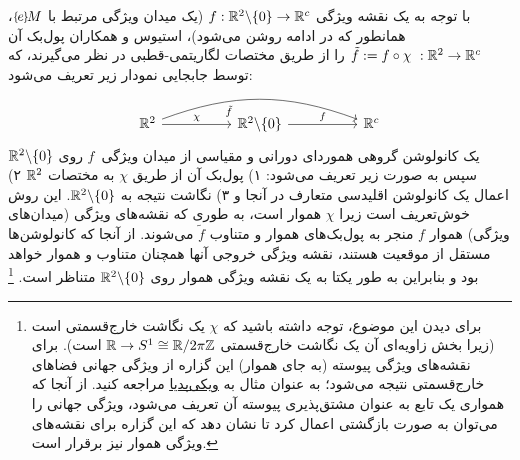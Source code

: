 با توجه به یک نقشه ویژگی $f: \mathbb{R}^2 \backslash \{0\} \to \mathbb{R}^c$ (یک میدان ویژگی مرتبط با $\eM$، همانطور که در ادامه روشن می‌شود)، استیوس و همکاران \cite{esteves2017polar} پول‌بک آن $\tilde{f} := f \circ \chi \ : \mathbb{R}^2 \to \mathbb{R}^c$ را از طریق مختصات لگاریتمی-قطبی در نظر می‌گیرند، که توسط جابجایی نمودار زیر تعریف می‌شود:
\begin{equation}
	\begin{tikzcd}[row sep=2.5em, column sep=5.em]
		\R^2
		\arrow[r, "\chi"]
		\arrow[rr, bend left=20, "\tilde{f}"', pos=0.3]
		& \R^2 \backslash \{0\}
		\arrow[r, "f"]
		& \R^c
	\end{tikzcd}
\end{equation}
یک کانولوشن گروهی هموردای دورانی و مقیاسی از میدان ویژگی~$f$ روی $\mathbb{R}^2 \backslash \{0\}$ سپس به صورت زیر تعریف می‌شود:
۱) پول‌بک آن از طریق $\chi$ به مختصات $\mathbb{R}^2$
۲) اعمال یک کانولوشن اقلیدسی متعارف در آنجا و
۳) نگاشت نتیجه به $\mathbb{R}^2 \backslash \{0\}$.
این روش خوش‌تعریف است زیرا $\chi$ هموار است، به طوری که نقشه‌های ویژگی (میدان‌های ویژگی) هموار $f$ منجر به پول‌بک‌های هموار و متناوب $\tilde{f}$ می‌شوند.
از آنجا که کانولوشن‌ها مستقل از موقعیت هستند، نقشه ویژگی خروجی آنها همچنان متناوب و هموار خواهد بود و بنابراین به طور یکتا به یک نقشه ویژگی هموار روی $\mathbb{R}^2 \backslash \{0\}$ متناظر است.%
\footnote{
	برای دیدن این موضوع، توجه داشته باشید که $\chi$ یک نگاشت خارج‌قسمتی است (زیرا بخش زاویه‌ای آن یک نگاشت خارج‌قسمتی $\mathbb{R} \to S^1 \cong \mathbb{R}/2\pi\mathbb{Z}$ است).
	برای نقشه‌های ویژگی پیوسته (به جای هموار) این گزاره از ویژگی جهانی فضاهای خارج‌قسمتی نتیجه می‌شود؛ به عنوان مثال به 
	\href{https://en.wikipedia.org/wiki/Quotient_space_(topology)\#Properties}{\underline{ویکی‌پدیا}}
	مراجعه کنید.
	از آنجا که همواری یک تابع به عنوان مشتق‌پذیری پیوسته آن تعریف می‌شود، ویژگی جهانی را می‌توان به صورت بازگشتی اعمال کرد تا نشان دهد که این گزاره برای نقشه‌های ویژگی هموار نیز برقرار است.
}

